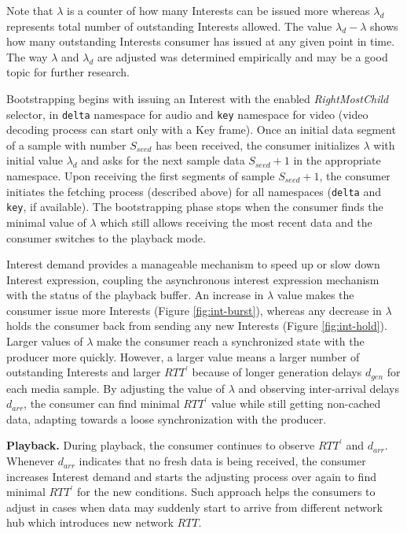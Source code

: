 \documentclass{icn/sig-alternate-2013} %
\newcommand{\wConcept}{Interest demand}
\begin{document}
Note that $\lambda$ is a counter of how many Interests can be issued more whereas $\lambda_d$ represents total number of outstanding Interests allowed. The value $\lambda_d-\lambda$ shows how many outstanding Interests consumer has issued at any given point in time. The way $\lambda$ and $\lambda_d$ are adjusted was determined empirically and may be a good topic for further research.

Bootstrapping begins with issuing an Interest with the enabled \textit{RightMostChild} selector, in \texttt{delta} namespace for audio and \texttt{key} namespace for video (video decoding process can start only with a Key frame). %
Once an initial data segment of a sample with number $S_{seed}$ has been received, the consumer initializes $\lambda$ with initial value $\lambda_d$ and asks for the next sample data $S_{seed}+1$ in the appropriate namespace. Upon receiving the first segments of sample $S_{seed}+1$, the consumer initiates the fetching process (described above) for all namespaces (\texttt{delta} and \texttt{key}, if available). The bootstrapping phase stops when the consumer finds the minimal value of $\lambda$ which still allows receiving the most recent data and the consumer switches to the playback mode.

\wConcept{} provides a manageable mechanism to speed up or slow down Interest expression, coupling the asynchronous interest expression mechanism with the status of the playback buffer. An increase in $\lambda$ value makes the consumer issue more Interests (Figure \ref{fig:int-burst}), whereas any decrease in $\lambda$ holds the consumer back from sending any new Interests (Figure \ref{fig:int-hold}). Larger values of $\lambda$ make the consumer reach a synchronized state with the producer more quickly. However, a larger value means a larger number of outstanding Interests and larger $RTT^\prime$ because of longer generation delays $d_{gen}$ for each media sample. By adjusting the value of $\lambda$ and observing inter-arrival delays $d_{arr}$, the consumer can find minimal $RTT^\prime$ value while still getting non-cached data, adapting towards a loose synchronization with the producer.

\textbf{Playback.}  During playback, the consumer continues to observe $RTT^\prime$ and $d_{arr}$. Whenever $d_{arr}$ indicates that no fresh data is being received, the consumer increases \wConcept{} and starts the adjusting process over again to find minimal $RTT^\prime$ for the new conditions. Such approach helps the consumers to adjust in cases when data may suddenly start to arrive from different network hub which introduces new network $RTT$.
\end{document}
